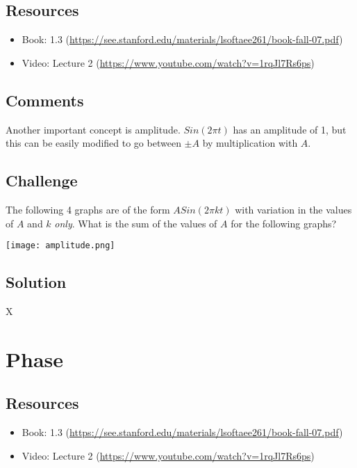 \subsection*{Resources}
\begin{itemize}
    \item Book: 1.3 (\url{https://see.stanford.edu/materials/lsoftaee261/book-fall-07.pdf})
    \item Video: Lecture 2 (\url{https://www.youtube.com/watch?v=1rqJl7Rs6ps})
\end{itemize}

\subsection*{Comments}
Another important concept is amplitude. $Sin(2 \pi t)$ has an amplitude of 1, but this can be easily modified to go between $\pm A$ by multiplication with $A$.

\subsection*{Challenge}

The following 4 graphs are of the form $A Sin(2 \pi k t)$ with variation in the values of $A$ and $k$ \emph{only}. What is the sum of the values of $A$ for the following graphs? 

\texttt{[image: amplitude.png]}

\subsection*{Solution}
X





\newpage

\section{Phase}

\subsection*{Resources}
\begin{itemize}
    \item Book: 1.3 (\url{https://see.stanford.edu/materials/lsoftaee261/book-fall-07.pdf})
    \item Video: Lecture 2 (\url{https://www.youtube.com/watch?v=1rqJl7Rs6ps})
\end{itemize}

